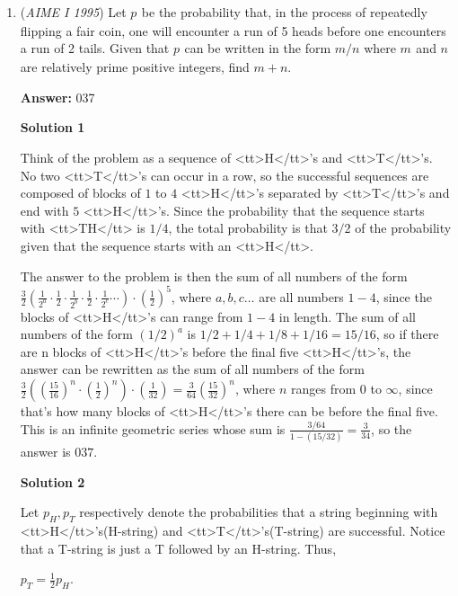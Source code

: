 \begin{enumerate}
 -NL008

 


	\item (\textit{AIME I 1995}) Let $p_{}$ be the probability that, in the process of repeatedly flipping a fair coin, one will encounter a run of 5 heads before one encounters a run of 2 tails.  Given that $p_{}$ can be written in the form $m/n$ where $m_{}$ and $n_{}$ are relatively prime positive integers, find $m+n$.


 
 \textbf{Answer: }037



\textbf{Solution 1}

Think of the problem as a sequence of <tt>H</tt>'s and <tt>T</tt>'s. No two <tt>T</tt>'s can occur in a row, so the successful sequences are composed of blocks of $1$ to $4$ <tt>H</tt>'s separated by <tt>T</tt>'s and end with $5$ <tt>H</tt>'s. Since the probability that the sequence starts with <tt>TH</tt> is $1/4$, the total probability is that $3/2$ of the probability given that the sequence starts with an <tt>H</tt>. 

 The answer to the problem is then the sum of all numbers of the form $\frac 32 \left( \frac 1{2^a} \cdot \frac 12 \cdot \frac 1{2^b} \cdot \frac 12 \cdot \frac 1{2^c} \cdots \right) \cdot \left(\frac 12\right)^5$, where $a,b,c \ldots$ are all numbers $1-4$, since the blocks of <tt>H</tt>'s can range from $1-4$ in length. The sum of all numbers of the form $(1/2)^a$ is $1/2+1/4+1/8+1/16=15/16$, so if there are n blocks of <tt>H</tt>'s before the final five <tt>H</tt>'s, the answer can be rewritten as the sum of all numbers of the form $\frac 32\left( \left(\frac {15}{16}\right)^n \cdot \left(\frac 12\right)^n \right) \cdot \left(\frac 1{32}\right)=\frac 3{64}\left(\frac{15}{32}\right)^n$, where $n$ ranges from $0$ to $\infty$, since that's how many blocks of <tt>H</tt>'s there can be before the final five. This is an infinite geometric series whose sum is $\frac{3/64}{1-(15/32)}=\frac{3}{34}$, so the answer is $\boxed{037}$.

 



\textbf{Solution 2}

Let $p_H, p_T$ respectively denote the probabilities that a string beginning with <tt>H</tt>'s(H-string) and <tt>T</tt>'s(T-string) are successful. Notice that a T-string is just a T followed by an H-string. Thus, 

 $p_T = \frac 12p_H.$


\end{enumerate}
